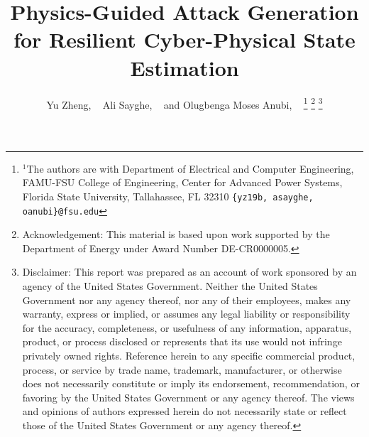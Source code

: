 \documentclass[journal]{IEEEtran}
\begin{document}
%
\title{
Physics-Guided Attack Generation for Resilient Cyber-Physical State Estimation
}
%
%
%

\author{Yu Zheng, ~
Ali Sayghe, ~
and Olugbenga Moses Anubi, ~
\thanks{$^{1}$The authors are with Department of Electrical and Computer Engineering, FAMU-FSU College of Engineering, Center for Advanced Power Systems, Florida State University, Tallahassee, FL 32310
        {\tt\small \{yz19b, asayghe, oanubi\}@fsu.edu}}
\thanks{Acknowledgement: This material is based upon work supported by the Department of Energy under Award Number DE-CR0000005.
}%
\thanks{Disclaimer: This report was prepared as an account of work sponsored by an agency of the United States Government.  Neither the United States Government nor any agency thereof, nor any of their employees, makes any warranty, express or implied, or assumes any legal liability or responsibility for the accuracy, completeness, or usefulness of any information, apparatus, product, or process disclosed or represents that its use would not infringe privately owned rights. Reference herein to any specific commercial product, process, or service by trade name, trademark, manufacturer, or otherwise does not necessarily constitute or imply its endorsement, recommendation, or favoring by the United States Government or any agency thereof.  The views and opinions of authors expressed herein do not necessarily state or reflect those of the United States Government or any agency thereof.}
%
}
\end{document}

